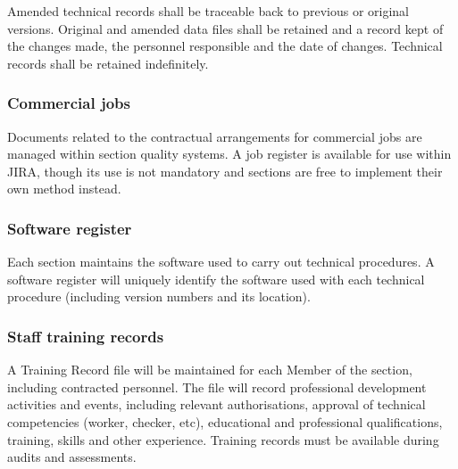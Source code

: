 Amended technical records shall be traceable back to previous or original versions. Original and amended data files shall be retained and a record kept of the changes made, the personnel responsible and the date of changes.
Technical records shall be retained indefinitely.

\subsubsection{Commercial jobs}

Documents related to the contractual arrangements for commercial jobs are managed within section quality systems. A job register is available for use within JIRA, though its use is not mandatory and sections are free to implement their own method instead.


\subsubsection{Software register}
Each section maintains the software used to carry out technical procedures. 
A software register will uniquely identify the software used with each technical procedure (including version numbers and its location). 

\subsubsection{Staff training records}
\label{sss:training_records}
A Training Record file will be maintained for each Member of the section, including contracted personnel. The file will record professional development activities and events, including relevant authorisations, approval of technical competencies (worker, checker, etc), educational and professional qualifications, training, skills and other experience. 
Training records must be available during audits and assessments. 

